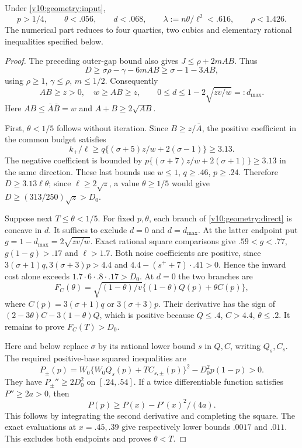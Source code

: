 \begin{theorem}\label{v10:geometry:global}
Under \eqref{v10:geometry:input},
\[
 p>1/4,\qquad \theta<.056,\qquad d<.068,\qquad
 \lambda:=n\theta/\ell^2<.616,\qquad \rho<1.426.
\]
The numerical part reduces to four quartics, two cubics and elementary
rational inequalities specified below.
\end{theorem}
\begin{proof}
The preceding outer-gap bound also gives $J\le\rho+2mAB$. Thus
\[
 D\ge\sigma\rho-\gamma-6mAB\ge\sigma-1-3AB,
\]
using $\rho\ge1$, $\gamma\le\rho$, $m\le1/2$. Consequently
\begin{equation}\label{v10:geometry:domain}
 AB\ge z>0,\quad w\ge AB\ge z,\qquad
 0\le d\le1-2\sqrt{zv/w}=:d_{\max}.
\end{equation}
Here $AB\le\bar A\bar B=w$ and $A+B\ge2\sqrt{AB}$.

First, $\theta<1/5$ follows without iteration. Since
$B\ge z/\bar A$, the positive coefficient in the common budget satisfies
\[
 k_+/\ell\ge q\{(\sigma+5)z/w+2(\sigma-1)\}\ge3.13.
\]
The negative coefficient is bounded by
$p\{(\sigma+7)z/w+2(\sigma+1)\}\ge3.13$ in the same direction.
These last bounds use $w\le1$, $q\ge.46$, $p\ge.24$.
Therefore $D\ge3.13\ell\theta$; since $\ell\ge2\sqrt z$, a value
$\theta\ge1/5$ would give $D\ge(313/250)\sqrt z>D_0$.

Suppose next $T\le\theta<1/5$. For fixed $p,\theta$, each branch
of \eqref{v10:geometry:direct} is concave in $d$. It suffices to
exclude $d=0$ and $d=d_{\max}$. At the latter endpoint put
$g=1-d_{\max}=2\sqrt{zv/w}$. Exact rational square comparisons give
$.59<g<.77$, $g(1-g)>.17$ and $\ell>1.7$.
Both noise coefficients are positive, since
$3(\sigma+1)q,3(\sigma+3)p>4.4$ and
$4.4-(s^++7)\cdot.41>0$. Hence the inward cost alone exceeds
$1.7\cdot6\cdot.8\cdot.17>D_0$.
At $d=0$ the two branches are
\[
 F_C(\theta)=\sqrt{(1-\theta)/v}\{(1-\theta)Q(p)+\theta C(p)\},
\]
where $C(p)=3(\sigma+1)q$ or $3(\sigma+3)p$.
Their derivative has the sign of
$(2-3\theta)C-3(1-\theta)Q$, which is positive because
$Q\le.4$, $C>4.4$, $\theta\le.2$.
It remains to prove $F_C(T)>D_0$.

Here and below replace $\sigma$ by its rational lower bound $s$ in
$Q,C$, writing $Q_s,C_s$. The required positive-base squared inequalities
are
\[
 P_\pm(p)=W_0\{W_0Q_s(p)+TC_{s,\pm}(p)\}^2-D_0^2p(1-p)>0.
\]
They have $P_\pm''\ge2D_0^2$ on $[.24,.54]$. If a twice differentiable
function satisfies $P''\ge2a>0$, then
\begin{equation}\label{v10:geometry:tangent}
 P(p)\ge P(x)-P'(x)^2/(4a).
\end{equation}
This follows by integrating the second derivative and completing the square.
The exact evaluations at $x=.45,.39$ give respectively lower bounds
$.0017$ and $.011$. This excludes both endpoints and proves $\theta<T$.


\end{proof}

